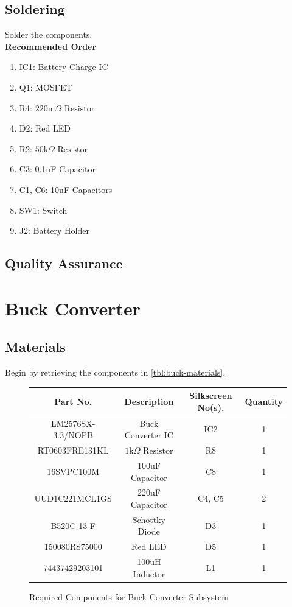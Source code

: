 \documentclass{article}
\newcommand{\resistor}[1]{$\text{#1} \Omega \text{ Resistor}$}
\begin{document}
\subsection{Soldering}

Solder the components. \\

\noindent \textbf{Recommended Order}

\begin{enumerate}
  \item IC1: Battery Charge IC
  \item Q1: MOSFET
  \item R4: \resistor{220m} 
  \item D2: Red LED
  \item R2: \resistor{50k}
  \item C3: 0.1uF Capacitor
  \item C1, C6: 10uF Capacitors 
  \item SW1: Switch
  \item J2: Battery Holder
\end{enumerate}

\subsection{Quality Assurance}

\section{Buck Converter}

\subsection{Materials}
Begin by retrieving the components in \autoref{tbl:buck-materials}.

\begin{figure}[H]
    \begin{center}
        \begin{tabular}{ c|c|c|c } 
            \textbf{Part No.} & \textbf{Description} & \textbf{Silkscreen No(s).} & \textbf{Quantity} \\ 
            \hline
            LM2576SX-3.3/NOPB & Buck Converter IC & IC2 & 1 \\ 
            \hline
            RT0603FRE131KL & \resistor{1k} & R8 & 1 \\ 
            \hline
            16SVPC100M & 100uF Capacitor & C8 & 1 \\ 
            \hline
            UUD1C221MCL1GS & 220uF Capacitor & C4, C5 & 2 \\ 
            \hline
            B520C-13-F & Schottky Diode & D3 & 1 \\ 
            \hline
            150080RS75000 & Red LED & D5 & 1 \\ 
            \hline
            74437429203101 & 100uH Inductor & L1 & 1 \\ 
        \end{tabular}
    \end{center}
    \caption{Required Components for Buck Converter Subsystem}
    \label{tbl:buck-materials}
\end{figure}
\end{document}
